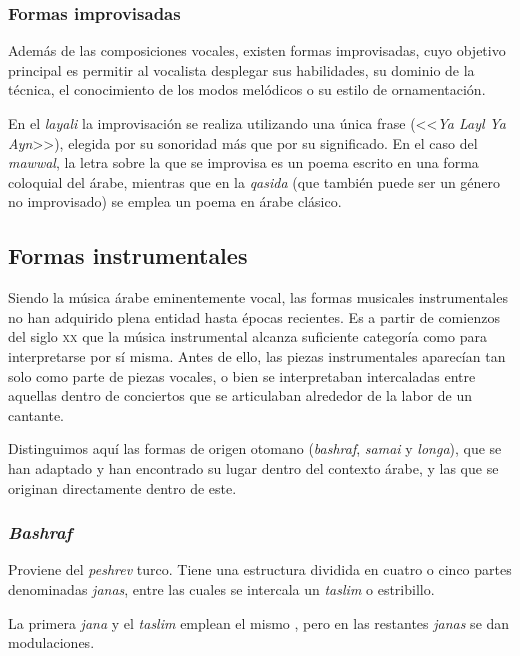 
    \subsubsection{Formas improvisadas}

    Además de las composiciones vocales, existen formas improvisadas, cuyo objetivo principal es permitir al vocalista desplegar sus habilidades, su dominio de la técnica, el conocimiento de los modos melódicos o su estilo de ornamentación.

    En el \emph{layali} la improvisación se realiza utilizando una única frase (<<\emph{Ya Layl Ya Ayn}>>), elegida por su sonoridad más que por su significado. En el caso del \emph{mawwal}, la letra sobre la que se improvisa es un poema escrito en una forma coloquial del árabe, mientras que en la \emph{qasida} (que también puede ser un género no improvisado) se emplea un poema en árabe clásico.

\subsection{Formas instrumentales}

    Siendo la música árabe eminentemente vocal, las formas musicales instrumentales no han adquirido plena entidad hasta épocas recientes. Es a partir de comienzos del siglo \textsc{xx} que la música instrumental alcanza suficiente categoría como para interpretarse por sí misma. Antes de ello, las piezas instrumentales aparecían tan solo como parte de piezas vocales, o bien se interpretaban intercaladas entre aquellas dentro de conciertos que se articulaban alrededor de la labor de un cantante.

    Distinguimos aquí las formas de origen otomano (\emph{bashraf}, \emph{samai} y \emph{longa}), que se han adaptado y han encontrado su lugar dentro del contexto árabe, y las que se originan directamente dentro de este.

    \subsubsection{\emph{Bashraf}}

        Proviene del \emph{peshrev} turco. Tiene una estructura dividida en cuatro o cinco partes denominadas \emph{janas}, entre las cuales se intercala un \emph{taslim} o estribillo.

        La primera \emph{jana} y el \emph{taslim} emplean el mismo \maqamb, pero en las restantes \emph{janas} se dan modulaciones.


